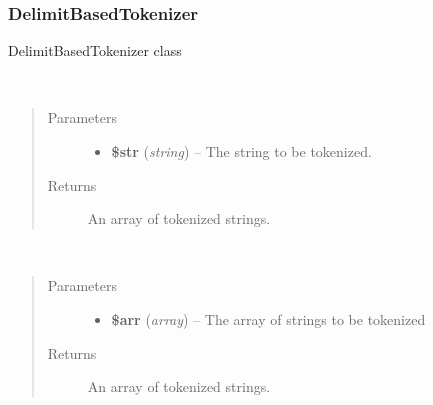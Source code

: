 \documentclass[letterpaper,10pt,english]{sphinxmanual}
\begin{document}
\subsubsection{DelimitBasedTokenizer}
\label{docs/api:delimitbasedtokenizer}

\begin{fulllineitems}
\label{docs/api:DelimitBasedTokenizer}
DelimitBasedTokenizer class

\begin{fulllineitems}
\label{docs/api:DelimitBasedTokenizer::tokenizeString}~\begin{quote}\begin{description}
\item[{Parameters}] \leavevmode\begin{itemize}
\item {} 
\textbf{\$str} (\emph{string}) -- The string to be tokenized.

\end{itemize}

\item[{Returns}] \leavevmode
An array of tokenized strings.

\end{description}\end{quote}

\end{fulllineitems}


\begin{fulllineitems}
\label{docs/api:DelimitBasedTokenizer::tokenizeArrayOfStrings}~\begin{quote}\begin{description}
\item[{Parameters}] \leavevmode\begin{itemize}
\item {} 
\textbf{\$arr} (\emph{array}) -- The array of strings to be tokenized

\end{itemize}

\item[{Returns}] \leavevmode
An array of tokenized strings.

\end{description}\end{quote}

\end{fulllineitems}


\end{fulllineitems}
\end{document}
